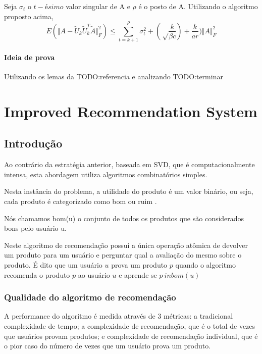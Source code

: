 \documentclass[a4paper,10pt]{article}
\begin{document}
\begin{teo}
Seja $\sigma_t$ o $t-ésimo$ valor singular de A e $\rho$ é o posto de A. Utilizando
o algoritmo proposto acima, 
\begin{equation}
E(\Vert A - \tilde U_k \tilde U_k^T \tilde A \Vert^2_F) \leq \sum_{t = k + 1}^\rho \sigma_t^2 + 
(\sqrt\frac{k}{\beta c})  + \frac{k}{ar})\Vert A \Vert^2_F
\end{equation}
\end{teo}

\paragraph{Ideia de prova\\} 
Utilizando os lemas da TODO:referencia e  analizando TODO:terminar

\newpage

\section{Improved Recommendation System}

\subsection{Introdução}
Ao contrário da estratégia anterior, baseada em SVD, que é computacionalmente
intensa, esta abordagem utiliza algoritmos combinatórios simples. 

Nesta instância do problema, a utilidade do produto é um valor binário, ou seja,
cada produto é categorizado como bom ou ruim .

Nós chamamos bom(u) o conjunto de todos os produtos que são considerados bons
pelo usuário u.

Neste algoritmo de recomendação possui a única operação atômica de devolver um
produto para um usuário e perguntar qual a avaliação do mesmo sobre o produto.
É dito que um usuário $u$ prova um produto $p$  quando o algoritmo recomenda
o produto $p$ ao usuário $u$ e aprende se $p \ in bom(u)$  

\subsubsection{Qualidade do algoritmo de recomendação}
A performance do algoritmo é medida através de 3 métricas: a tradicional
complexidade de tempo; a complexidade de recomendação, que é o total de 
vezes que usuários provam produtos; e complexidade de recomendação 
individual, que é o pior caso do número de vezes que um usuário prova
um produto.
\end{document}
